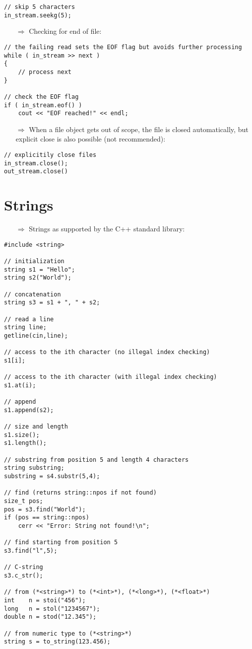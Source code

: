 \documentclass[10pt]{article}
\begin{document}
\begin{lstlisting}
// skip 5 characters
in_stream.seekg(5);
\end{lstlisting}
\begin{enumerate}
\item[$\Rightarrow$] Checking for end of file:
\end{enumerate}
\begin{lstlisting}
// the failing read sets the EOF flag but avoids further processing
while ( in_stream >> next )
{
    // process next
}

// check the EOF flag
if ( in_stream.eof() )
    cout << "EOF reached!" << endl;
\end{lstlisting}
\begin{enumerate}
\item[$\Rightarrow$] When a file object gets out of scope, the file is closed automatically, but explicit
close is also possible (not recommended):
\end{enumerate}
\begin{lstlisting}
// explicitily close files
in_stream.close();
out_stream.close()
\end{lstlisting}
%
%
\section{Strings}
\small
\begin{enumerate}
\item[$\Rightarrow$] Strings as supported by the C++ standard library:
\end{enumerate}
\begin{lstlisting}
#include <string>

// initialization
string s1 = "Hello";
string s2("World");

// concatenation
string s3 = s1 + ", " + s2;

// read a line
string line;
getline(cin,line);

// access to the ith character (no illegal index checking)
s1[i];

// access to the ith character (with illegal index checking)
s1.at(i);

// append
s1.append(s2);

// size and length
s1.size();
s1.length();

// substring from position 5 and length 4 characters
string substring;
substring = s4.substr(5,4);

// find (returns string::npos if not found)
size_t pos;
pos = s3.find("World");
if (pos == string::npos)
    cerr << "Error: String not found!\n";

// find starting from position 5
s3.find("l",5);

// C-string
s3.c_str();

// from (*<string>*) to (*<int>*), (*<long>*), (*<float>*)
int    n = stoi("456");
long   n = stol("1234567");
double n = stod("12.345");

// from numeric type to (*<string>*)
string s = to_string(123.456);
\end{lstlisting}
%
%
\end{document}
